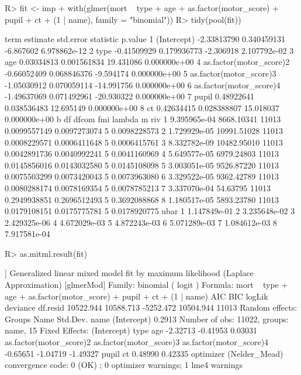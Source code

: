 \documentclass[
]{jss}
\begin{document}
\begin{CodeChunk}
\begin{CodeInput}
R> fit <- imp %
+   with(glmer(mort ~ type + age + as.factor(motor_score) + pupil + ct + (1 | name), family = "binomial")) 
R> tidy(pool(fit))
\end{CodeInput}
\begin{CodeOutput}
                     term    estimate   std.error  statistic      p.value
1             (Intercept) -2.33813790 0.340459131  -6.867602 6.978862e-12
2                    type -0.41509929 0.179936773  -2.306918 2.107792e-02
3                     age  0.03034813 0.001561834  19.431086 0.000000e+00
4 as.factor(motor_score)2 -0.66052409 0.068846376  -9.594174 0.000000e+00
5 as.factor(motor_score)3 -1.05030912 0.070059114 -14.991756 0.000000e+00
6 as.factor(motor_score)4 -1.49637069 0.071492961 -20.930322 0.000000e+00
7                   pupil  0.48922641 0.038536483  12.695149 0.000000e+00
8                      ct  0.42634415 0.028388807  15.018037 0.000000e+00
             b          df dfcom          fmi       lambda m          riv
1 9.395965e-04  8668.10341 11013 0.0099557149 0.0097273074 5 0.0098228573
2 1.729929e-05 10991.51028 11013 0.0008229571 0.0006411648 5 0.0006415761
3 8.332782e-09 10482.95010 11013 0.0042891736 0.0040992241 5 0.0041160969
4 5.649577e-05  6979.24803 11013 0.0145856016 0.0143032580 5 0.0145108098
5 3.003051e-05  9526.87220 11013 0.0075503299 0.0073420043 5 0.0073963080
6 3.329522e-05  9362.42789 11013 0.0080288174 0.0078169354 5 0.0078785213
7 3.337070e-04    54.63795 11013 0.2949938851 0.2696512493 5 0.3692088868
8 1.180517e-05  5893.23780 11013 0.0179108151 0.0175775781 5 0.0178920775
          ubar
1 1.147849e-01
2 3.235648e-02
3 2.429325e-06
4 4.672029e-03
5 4.872243e-03
6 5.071289e-03
7 1.084612e-03
8 7.917581e-04
\end{CodeOutput}
\begin{CodeInput}
R> as.mitml.result(fit)
\end{CodeInput}
\begin{CodeOutput}
[[1]]
Generalized linear mixed model fit by maximum likelihood (Laplace
  Approximation) [glmerMod]
 Family: binomial  ( logit )
Formula: mort ~ type + age + as.factor(motor_score) + pupil + ct + (1 |  
    name)
      AIC       BIC    logLik  deviance  df.resid 
10522.944 10588.713 -5252.472 10504.944     11013 
Random effects:
 Groups Name        Std.Dev.
 name   (Intercept) 0.2913  
Number of obs: 11022, groups:  name, 15
Fixed Effects:
            (Intercept)                     type                      age  
               -2.32713                 -0.41953                  0.03031  
as.factor(motor_score)2  as.factor(motor_score)3  as.factor(motor_score)4  
               -0.65651                 -1.04719                 -1.49327  
                  pupil                       ct  
                0.48990                  0.42335  
optimizer (Nelder_Mead) convergence code: 0 (OK) ; 0 optimizer warnings; 1 lme4 warnings 


\end{CodeOutput}
\end{CodeChunk}
\end{document}
